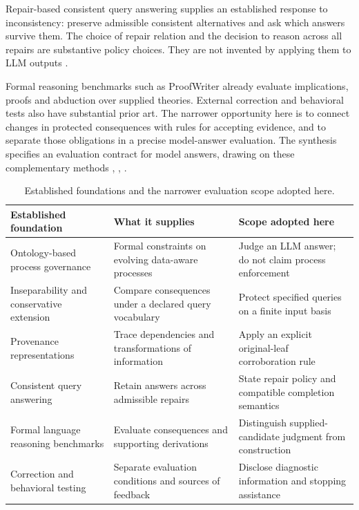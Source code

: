 \documentclass[a4paper,preprint,12pt,numbers,nopreprintline]{elsarticle}
\begin{document}
Repair-based consistent query answering supplies an established response to inconsistency: preserve admissible consistent alternatives and ask which answers survive them. The choice of repair relation and the decision to reason across all repairs are substantive policy choices. They are not invented by applying them to LLM outputs \citep{arenas}.

Formal reasoning benchmarks such as ProofWriter already evaluate implications, proofs and abduction over supplied theories. External correction and behavioral tests also have substantial prior art. The narrower opportunity here is to connect changes in protected consequences with rules for accepting evidence, and to separate those obligations in a precise model-answer evaluation. The synthesis specifies an evaluation contract for model answers, drawing on these complementary methods \citep{proofwriter}, \citep{checklist}, \citep{critic}.

\begin{table}[htbp]\centering\small
\caption{Established foundations and the narrower evaluation scope adopted here.}\label{tab:foundation-1}

\begin{tabularx}{\linewidth}{@{}*{3}{>{\raggedright\arraybackslash}X}@{}}\toprule
Established foundation & What it supplies & Scope adopted here\\
\midrule
Ontology-based process governance & Formal constraints on evolving data-aware processes & Judge an LLM answer; do not claim process enforcement\\
Inseparability and conservative extension & Compare consequences under a declared query vocabulary & Protect specified queries on a finite input basis\\
Provenance representations & Trace dependencies and transformations of information & Apply an explicit original-leaf corroboration rule\\
Consistent query answering & Retain answers across admissible repairs & State repair policy and compatible completion semantics\\
Formal language reasoning benchmarks & Evaluate consequences and supporting derivations & Distinguish supplied-candidate judgment from construction\\
Correction and behavioral testing & Separate evaluation conditions and sources of feedback & Disclose diagnostic information and stopping assistance\\
\bottomrule\end{tabularx}
\end{table}
\end{document}
